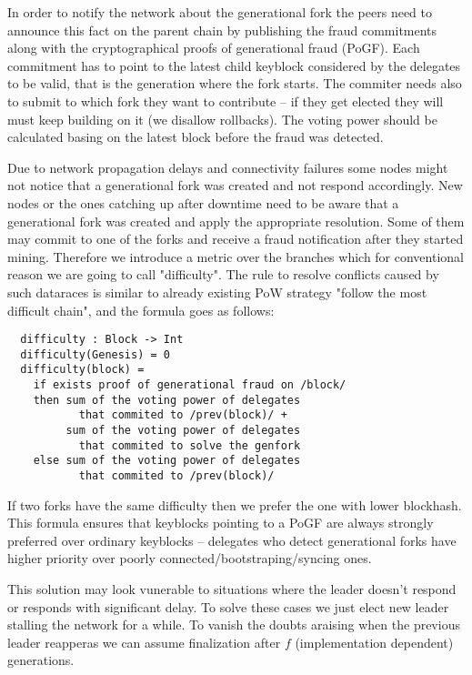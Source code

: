In order to notify the network about the generational fork the peers need to announce
this fact on the parent chain by publishing the fraud commitments along with the
cryptographical proofs of generational fraud (PoGF). Each commitment has to point to
the latest child keyblock considered by the delegates to be
valid, that is the generation where the fork starts. The commiter
needs also to submit to which fork they want to contribute – if they get elected they
will must keep building on it (we disallow rollbacks). The voting power should be
calculated basing on the latest block before the fraud was detected.

Due to network propagation
delays and connectivity failures some nodes might not notice that a generational
fork was created and not respond accordingly. New nodes or the ones catching up
after downtime need to be aware that a generational fork was created and apply
the appropriate resolution. Some of them may commit to one of the forks and receive a fraud
notification after they started mining. Therefore we introduce a metric over the
branches which for conventional reason we are going to call "difficulty". The
rule to resolve conflicts caused by such dataraces is similar to already
existing PoW strategy "follow the most difficult chain", and the formula goes
as follows:
\begin{minipage}{\linewidth}
\begin{lstlisting}
  difficulty : Block -> Int
  difficulty(Genesis) = 0
  difficulty(block) =
    if exists proof of generational fraud on /block/
    then sum of the voting power of delegates
           that commited to /prev(block)/ +
         sum of the voting power of delegates
           that commited to solve the genfork
    else sum of the voting power of delegates
           that commited to /prev(block)/
\end{lstlisting}
\end{minipage}

If two forks have the same difficulty then we prefer the one with lower
blockhash. This formula ensures that keyblocks pointing to a PoGF are always
strongly preferred over ordinary keyblocks – delegates who detect generational
forks have higher priority over poorly connected/bootstraping/syncing ones.

This solution may look vunerable to situations where the leader doesn't respond
or responds with significant delay. To solve these cases we just elect new
leader stalling the network for a while. To vanish the doubts araising when the
previous leader reapperas we can assume
finalization after $f$ (implementation dependent) generations.

